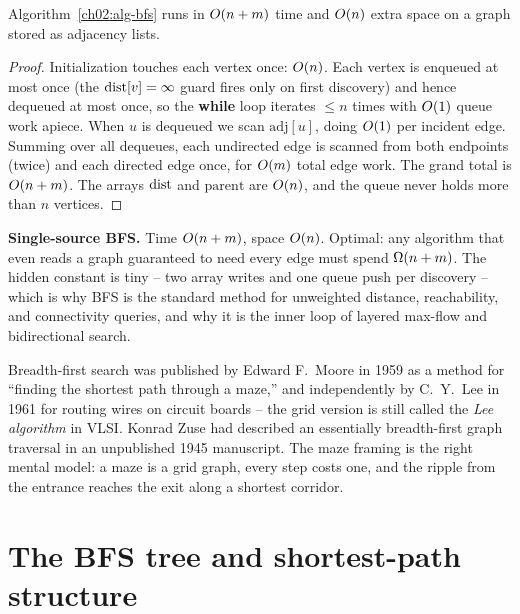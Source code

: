 \begin{theorem}
\label{ch02:thm-time}
Algorithm~\ref{ch02:alg-bfs} runs in $O(n+m)$ time and $O(n)$ extra space on
a graph stored as adjacency lists.
\end{theorem}

\begin{proof}
Initialization touches each vertex once: $O(n)$. Each vertex is enqueued at
most once (the $\operatorname{dist}[v]=\infty$ guard fires only on first discovery) and hence
dequeued at most once, so the \textbf{while} loop iterates $\le n$ times with
$O(1)$ queue work apiece. When $u$ is dequeued we scan $\mathrm{adj}[u]$, doing
$O(1)$ per incident edge. Summing over all dequeues, each undirected edge is
scanned from both endpoints (twice) and each directed edge once, for
$O(m)$ total edge work. The grand total is $O(n+m)$. The arrays $\operatorname{dist}$ and
$\mathrm{parent}$ are $O(n)$, and the queue never holds more than $n$ vertices.
\end{proof}

\begin{complexitybox}
\textbf{Single-source BFS.}\quad
Time $O(n+m)$, space $O(n)$. Optimal: any algorithm that even reads a graph
guaranteed to need every edge must spend $\Omega(n+m)$. The hidden constant is tiny
-- two array writes and one queue push per discovery -- which is why BFS is the
standard method for unweighted distance, reachability, and connectivity queries, and
why it is the inner loop of layered max-flow and bidirectional search.
\end{complexitybox}

\begin{historybox}
Breadth-first search was published by Edward F.\ Moore in 1959 as a method for
``finding the shortest path through a maze,'' and independently by C.\ Y.\ Lee in
1961 for routing wires on circuit boards -- the grid version is still called the
\emph{Lee algorithm} in VLSI. Konrad Zuse had described an essentially
breadth-first graph traversal in an unpublished 1945 manuscript. The maze framing
is the right mental model: a maze is a grid graph, every step costs one, and the
ripple from the entrance reaches the exit along a shortest corridor.
\end{historybox}

\section{The BFS tree and shortest-path structure}
\label{ch02:tree}

